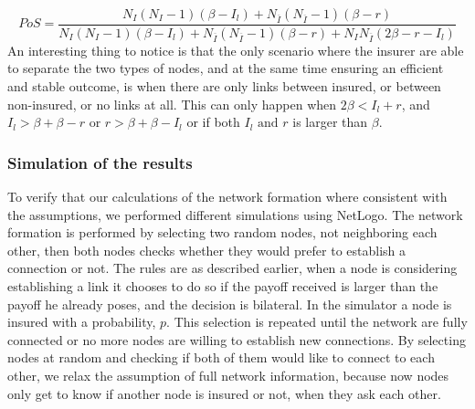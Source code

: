\begin{equation}
PoS=\frac{N_{I}(N_{I}-1)(\beta-I_{l})+N_{\overline{I}}(N_{\overline{I}}-1)(\beta-r)}{N_{I}(N_{I}-1)(\beta-I_{l})+N_{\overline{I}}(N_{\overline{I}}-1)(\beta-r)+N_{I}N_{\overline{I}}(2\beta-r-I_{l})}
\label{eq:model2-pos}
\end{equation}
An interesting thing to notice is that the only scenario where the insurer are able to separate the two types of nodes, and at the same time ensuring an efficient and stable outcome, is when there are only links between insured, or between non-insured, or no links at all.
This can only happen when $2\beta<I_{l}+r$, and $I_{l}>\beta+\beta-r$ or $r>\beta+\beta-I_{l}$ or if both $I_{l} \text{ and }r$ is larger than $\beta$.

\subsubsection{Simulation of the results}
To verify that our calculations of the network formation where consistent with the assumptions, we performed different simulations using NetLogo. The network formation is performed by selecting two random nodes, not neighboring each other, then both nodes checks whether they would prefer to establish a connection or not. 
The rules are as described earlier, when a node is considering establishing a link it chooses to do so if the payoff received is larger than the payoff he already poses, and the decision is bilateral.
In the simulator a node is insured with a probability, $p$. This selection is repeated until the network are fully connected or no more nodes are willing to establish new connections.
By selecting nodes at random and checking if both of them would like to connect to each other, we relax the assumption of full network information, because now nodes only get to know if another node is insured or not, when they ask each other.

